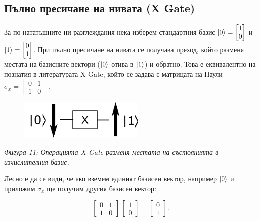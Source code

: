     \subsection{Пълно пресичане на нивата (X Gate)}

    За по-нататъшните ни разглеждания нека изберем стандартния базис $\ket{0} = \begin{bmatrix}
        1\\
        0
    \end{bmatrix}$ и $\ket{1} = \begin{bmatrix}
        0\\
        1
    \end{bmatrix}$. При пълно пресичане на нивата се получава преход, който разменя местата на базисните вектори ($\ket{0}$ отива в $\ket{1}$) и обратно.
    Това е еквивалентно на познатия в литературата X Gate, който се задава с матрицата на Паули $\sigma_x = \begin{bmatrix}
        0 & 1\\
        1 & 0
    \end{bmatrix}$.
    
    \begin{figure}[H]
        \centering
        \includegraphics[width=170pt]{16.png}
    \end{figure}
    \begin{center}
        \small \textit{Фигура 11: Операцията X Gate разменя местата на състоянията в изчислителния базис.}
    \end{center}

    Лесно е да се види, че ако вземем единият базисен вектор, например $\ket{0}$
    и приложим $\sigma_x$ ще получим другия базисен вектор:

    \begin{equation}
        \begin{bmatrix}
            0 & 1\\
            1 & 0
        \end{bmatrix} \, \begin{bmatrix}
            1\\
            0
        \end{bmatrix} = \begin{bmatrix}
            0\\
            1
        \end{bmatrix}.
    \end{equation}

